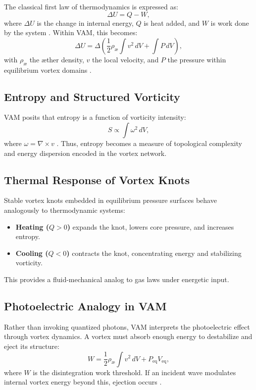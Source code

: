 The classical first law of thermodynamics is expressed as:
\begin{equation}
\Delta U = Q - W,
\end{equation}
where $\Delta U$ is the change in internal energy, $Q$ is heat added, and $W$ is work done by the system \cite{clausius1865mechanical}. Within VAM, this becomes:
\begin{equation}
\Delta U = \Delta \left( \frac{1}{2} \rho_{\text{\ae}} \int v^2 \, dV + \int P \, dV \right),
\end{equation}
with $\rho_{\text{\ae}}$ the æther density, $v$ the local velocity, and $P$ the pressure within equilibrium vortex domains \cite{vam2025unified}.

\subsection{Entropy and Structured Vorticity}

VAM posits that entropy is a function of vorticity intensity:
\begin{equation}
S \propto \int \omega^2 \, dV,
\end{equation}
where $\omega = \nabla \times v$ \cite{kelvin1867vortex}. Thus, entropy becomes a measure of topological complexity and energy dispersion encoded in the vortex network.

\subsection{Thermal Response of Vortex Knots}

Stable vortex knots embedded in equilibrium pressure surfaces behave analogously to thermodynamic systems:
\begin{itemize}
\item \textbf{Heating ($Q > 0$)} expands the knot, lowers core pressure, and increases entropy.
\item \textbf{Cooling ($Q < 0$)} contracts the knot, concentrating energy and stabilizing vorticity.
\end{itemize}
This provides a fluid-mechanical analog to gas laws under energetic input.

\subsection{Photoelectric Analogy in VAM}

Rather than invoking quantized photons, VAM interprets the photoelectric effect through vortex dynamics. A vortex must absorb enough energy to destabilize and eject its structure:
\begin{equation}
W = \frac{1}{2} \rho_{\text{\ae}} \int v^2 \, dV + P_{\text{eq}} V_{\text{eq}},
\end{equation}
where $W$ is the disintegration work threshold. If an incident wave modulates internal vortex energy beyond this, ejection occurs \cite{vam2025unified}.

